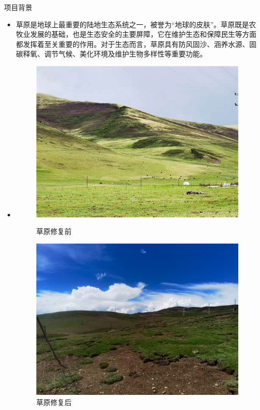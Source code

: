 \documentclass{beamer}
\begin{document}
\begin{frame}{项目背景}
    \begin{itemize}
        \item 草原是地球上最重要的陆地生态系统之一，被誉为“地球的皮肤”。草原既是农牧业发展的基础，也是生态安全的主要屏障，它在维护生态和保障民生等方面都发挥着至关重要的作用。对于生态而言，草原具有防风固沙、涵养水源、固碳释氧、调节气候、美化环境及维护生物多样性等重要功能。\cite{8249536}
        \item[]
              \begin{figure}[htbp]
                  \begin{minipage}{0.49\linewidth}
                      \centering
                      \includegraphics[scale=0.2]{pic/1.png}
                      \caption{草原修复前}
                  \end{minipage}
                  \begin{minipage}{0.49\linewidth}
                      \centering
                      \includegraphics[scale=0.08]{pic/2.png}
                      \caption{草原修复后}
                  \end{minipage}
              \end{figure}
    \end{itemize}
\end{frame}
\end{document}
